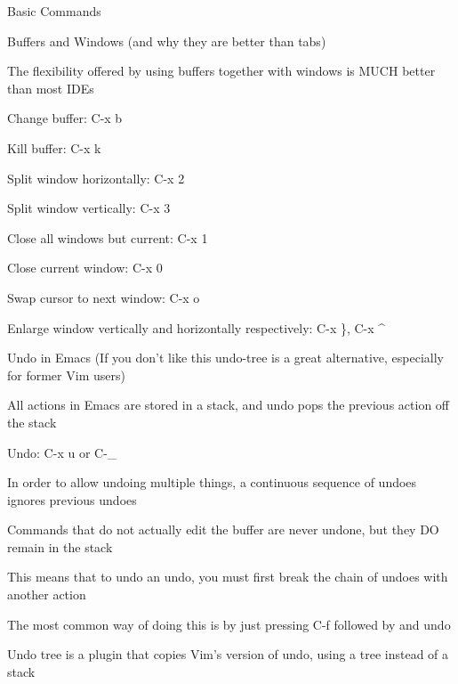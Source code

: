 \documentclass[presentation]{beamer}
\begin{document}
\begin{frame}[label=sec-2]{Basic Commands}
\begin{block}{Buffers and Windows (and why they are better than tabs)}
\begin{block}{The flexibility offered by using buffers together with windows is MUCH better than most IDEs}
\begin{block}{Change buffer: C-x b}
\end{block}
\begin{block}{Kill buffer: C-x k}
\end{block}
\begin{block}{Split window horizontally: C-x 2}
\end{block}
\begin{block}{Split window vertically: C-x 3}
\end{block}
\begin{block}{Close all windows but current: C-x 1}
\end{block}
\begin{block}{Close current window: C-x 0}
\end{block}
\begin{block}{Swap cursor to next window: C-x o}
\end{block}
\begin{block}{Enlarge window vertically and horizontally respectively: C-x \}, C-x \^{}}
\end{block}
\end{block}
\end{block}
\begin{block}{Undo in Emacs (If you don't like this undo-tree is a great alternative, especially for former Vim users)}
\begin{block}{All actions in Emacs are stored in a stack, and undo pops the previous action off the stack}
\begin{block}{Undo: C-x u or C-\_}
\end{block}
\end{block}
\begin{block}{In order to allow undoing multiple things, a continuous sequence of undoes ignores previous undoes}
\begin{block}{Commands that do not actually edit the buffer are never undone, but they DO remain in the stack}
\end{block}
\begin{block}{This means that to undo an undo, you must first break the chain of undoes with another action}
\end{block}
\begin{block}{The most common way of doing this is by just pressing C-f followed by and undo}
\end{block}
\end{block}
\begin{block}{Undo tree is a plugin that copies Vim's version of undo, using a tree instead of a stack}

\end{block}
\end{block}
\end{frame}
\end{document}
